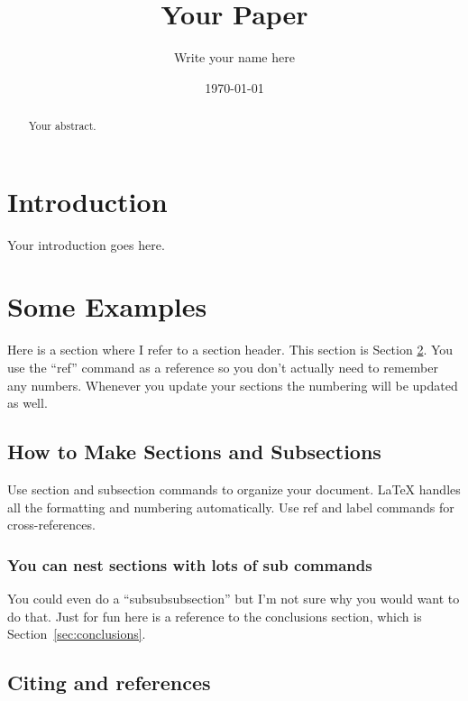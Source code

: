\documentclass[a4paper]{article}
\title{Your Paper}
\author{Write your name here}
\date{\today}
\begin{document}
\maketitle


\begin{abstract}
Your abstract.
\end{abstract}

\section{Introduction}

Your introduction goes here. 

\section{Some Examples}
\label{sec:examples}

Here is a section where I refer to a section header. This section is Section \ref{sec:examples}. You use the ``ref'' command as a reference so you don't actually need to remember any numbers. Whenever you update your sections the numbering will be updated as well. 

\subsection{How to Make Sections and Subsections}

Use section and subsection commands to organize your document. \LaTeX{} handles all the formatting and numbering automatically. Use ref and label commands for cross-references.

\subsubsection{You can nest sections with lots of sub commands}

You could even do a ``subsubsubsection'' but I'm not sure why you would want to do that. Just for fun here is a reference to the conclusions section, which is Section~\ref{sec:conclusions}.

\subsection{Citing and references}
\end{document}
